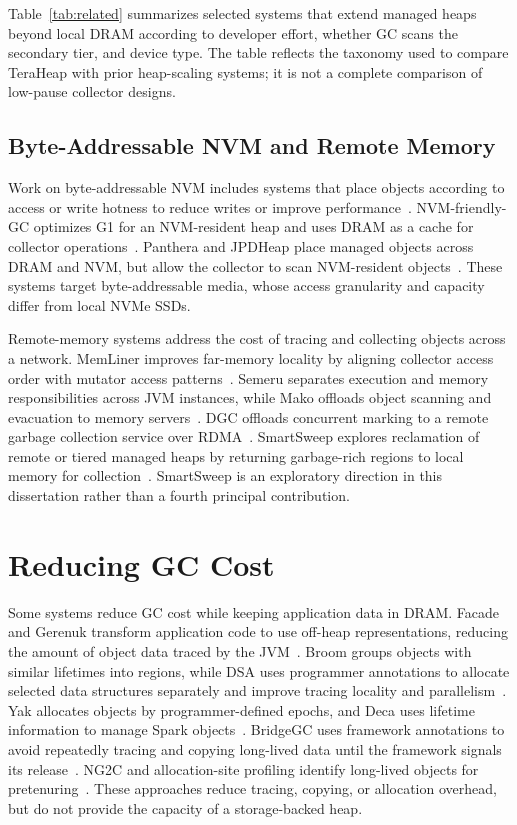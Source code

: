 Table~\ref{tab:related} summarizes selected systems that extend managed heaps beyond local DRAM according to developer effort, whether GC scans the secondary tier, and device type.
The table reflects the taxonomy used to compare TeraHeap with prior heap-scaling systems; it is not a complete comparison of low-pause collector designs.



\subsection{Byte-Addressable NVM and Remote Memory}

Work on byte-addressable NVM includes systems that place objects according to access or write hotness to reduce writes or improve performance~\cite{akram:ration,akram:crystal,gcmove,thingc}.
NVM-friendly-GC optimizes G1 for an NVM-resident heap and uses DRAM as a cache for collector operations~\cite{Xu:gc_evaluation}.
Panthera and JPDHeap place managed objects across DRAM and NVM, but allow the collector to scan NVM-resident objects~\cite{wang:Panthera,jpd_heap}.
These systems target byte-addressable media, whose access granularity and capacity differ from local NVMe SSDs.

Remote-memory systems address the cost of tracing and collecting objects across a network.
MemLiner improves far-memory locality by aligning collector access order with mutator access patterns~\cite{wang:memliner}.
Semeru separates execution and memory responsibilities across JVM instances, while Mako offloads object scanning and evacuation to memory servers~\cite{wang:semeru,ma:mako}.
DGC offloads concurrent marking to a remote garbage collection service over RDMA~\cite{hongtao:dgc}.
SmartSweep explores reclamation of remote or tiered managed heaps by returning garbage-rich regions to local memory for collection~\cite{kolokasis:smartsweep}.
SmartSweep is an exploratory direction in this dissertation rather than a fourth principal contribution.

\section{Reducing GC Cost}

Some systems reduce GC cost while keeping application data in DRAM.
Facade and Gerenuk transform application code to use off-heap representations, reducing the amount of object data traced by the JVM~\cite{nguyen:facade,navasca:gerenuk}.
Broom groups objects with similar lifetimes into regions, while DSA uses programmer annotations to allocate selected data structures separately and improve tracing locality and parallelism~\cite{gog:broom,cohen:dsa}.
Yak allocates objects by programmer-defined epochs, and Deca uses lifetime information to manage Spark objects~\cite{khanh:yak,lu:deca}.
BridgeGC uses framework annotations to avoid repeatedly tracing and copying long-lived data until the framework signals its release~\cite{wang:bridgegc}.
NG2C and allocation-site profiling identify long-lived objects for pretenuring~\cite{bruno:n2gc,pretenuring,Blackburn:2001:PJ}.
These approaches reduce tracing, copying, or allocation overhead, but do not provide the capacity of a storage-backed heap.


